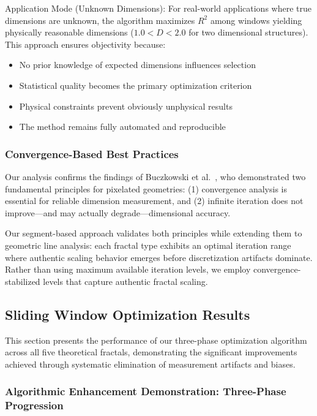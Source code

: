 \documentclass[preprint,12pt]{elsarticle}
\def\textbf#1{#1}%
\begin{document}
\textbf{Application Mode (Unknown Dimensions)}:
For real-world applications where true dimensions are unknown, the algorithm maximizes $R^2$ among windows yielding physically reasonable dimensions ($1.0 < D < 2.0$ for two dimensional structures). This approach ensures objectivity because:
\begin{itemize}
\item No prior knowledge of expected dimensions influences selection
\item Statistical quality becomes the primary optimization criterion
\item Physical constraints prevent obviously unphysical results
\item The method remains fully automated and reproducible
\end{itemize}

\subsubsection{Convergence-Based Best Practices}

Our analysis confirms the findings of Buczkowski et al.~\cite{buczkowski1998}, who demonstrated two fundamental principles for pixelated geometries: (1) convergence analysis is essential for reliable dimension measurement, and (2) infinite iteration does not improve—and may actually degrade—dimensional accuracy.

Our segment-based approach validates both principles while extending them to geometric line analysis: each fractal type exhibits an optimal iteration range where authentic scaling behavior emerges before discretization artifacts dominate. Rather than using maximum available iteration levels, we employ convergence-stabilized levels that capture authentic fractal scaling.

\subsection{Sliding Window Optimization Results}
\label{subsec:sliding_window_results}

This section presents the performance of our three-phase optimization algorithm across all five theoretical fractals, demonstrating the significant improvements achieved through systematic elimination of measurement artifacts and biases.

\subsubsection{Algorithmic Enhancement Demonstration: Three-Phase Progression}
\end{document}
